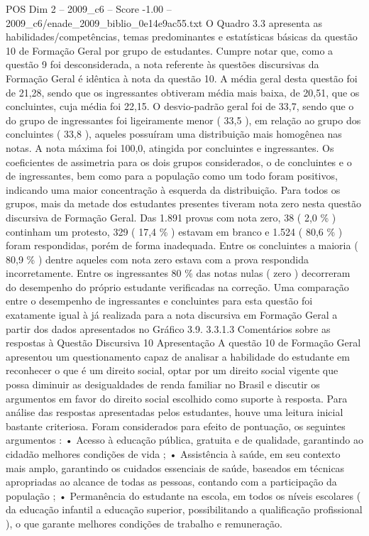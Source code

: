 \begin{textsample}{POS Dim 2 – 2009\_c6 – Score -1.00 – 2009\_c6/enade\_2009\_biblio\_0e14e9ac55.txt}
O Quadro 3.3 apresenta as habilidades/competências, temas predominantes e estatísticas básicas da questão 10 de Formação Geral por grupo de estudantes.
Cumpre notar que, como a questão 9 foi desconsiderada, a nota referente às questões discursivas da Formação Geral é idêntica à nota da questão 10.
A média geral desta questão foi de 21,28, sendo que os ingressantes obtiveram média mais baixa, de 20,51, que os concluintes, cuja média foi 22,15.
O desvio-padrão geral foi de 33,7, sendo que o do grupo de ingressantes foi ligeiramente menor ( 33,5 ), em relação ao grupo dos concluintes ( 33,8 ), aqueles possuíram uma distribuição mais homogênea nas notas.
A nota máxima foi 100,0, atingida por concluintes e ingressantes.
Os coeficientes de assimetria para os dois grupos considerados, o de concluintes e o de ingressantes, bem como para a população como um todo foram positivos, indicando uma maior concentração à esquerda da distribuição.
Para todos os grupos, mais da metade dos estudantes presentes tiveram nota zero nesta questão discursiva de Formação Geral.
Das 1.891 provas com nota zero, 38 ( 2,0 \% ) continham um protesto, 329 ( 17,4 \% ) estavam em branco e 1.524 ( 80,6 \% ) foram respondidas, porém de forma inadequada.
Entre os concluintes a maioria ( 80,9 \% ) dentre aqueles com nota zero estava com a prova respondida incorretamente.
Entre os ingressantes 80 \% das notas nulas ( zero ) decorreram do desempenho do próprio estudante verificadas na correção.
Uma comparação entre o desempenho de ingressantes e concluintes para esta questão foi exatamente igual à já realizada para a nota discursiva em Formação Geral a partir dos dados apresentados no Gráfico 3.9. 3.3.1.3 Comentários sobre as respostas à Questão Discursiva 10 Apresentação A questão 10 de Formação Geral apresentou um questionamento capaz de analisar a habilidade do estudante em reconhecer o que é um direito social, optar por um direito social vigente que possa diminuir as desigualdades de renda familiar no Brasil e discutir os argumentos em favor do direito social escolhido como suporte à resposta.
Para análise das respostas apresentadas pelos estudantes, houve uma leitura inicial bastante criteriosa.
Foram considerados para efeito de pontuação, os seguintes argumentos : • Acesso à educação pública, gratuita e de qualidade, garantindo ao cidadão melhores condições de vida ; • Assistência à saúde, em seu contexto mais amplo, garantindo os cuidados essenciais de saúde, baseados em técnicas apropriadas ao alcance de todas as pessoas, contando com a participação da população ; • Permanência do estudante na escola, em todos os níveis escolares ( da educação infantil a educação superior, possibilitando a qualificação profissional ), o que garante melhores condições de trabalho e remuneração.

\end{textsample}
